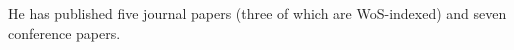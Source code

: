 \noindent He has published five journal papers (three of which are WoS-indexed) and seven conference papers.


\newpage \pagestyle{empty}






\newpage 